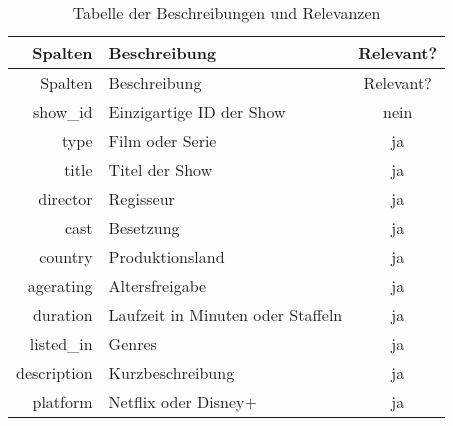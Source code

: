\documentclass[
]{article}
\begin{document}
\begin{longtable}[]{@{}rlc@{}}
\caption{Tabelle der Beschreibungen und Relevanzen}\tabularnewline
\toprule\noalign{}
Spalten & Beschreibung & Relevant? \\
\midrule\noalign{}
\endfirsthead
\toprule\noalign{}
Spalten & Beschreibung & Relevant? \\
\midrule\noalign{}
\endhead
\bottomrule\noalign{}
\endlastfoot
show\_id & Einzigartige ID der Show & nein \\
type & Film oder Serie & ja \\
title & Titel der Show & ja \\
director & Regisseur & ja \\
cast & Besetzung & ja \\
country & Produktionsland & ja \\
agerating & Altersfreigabe & ja \\
duration & Laufzeit in Minuten oder Staffeln & ja \\
listed\_in & Genres & ja \\
description & Kurzbeschreibung & ja \\
platform & Netflix oder Disney+ & ja \\
\end{longtable}
\end{document}
